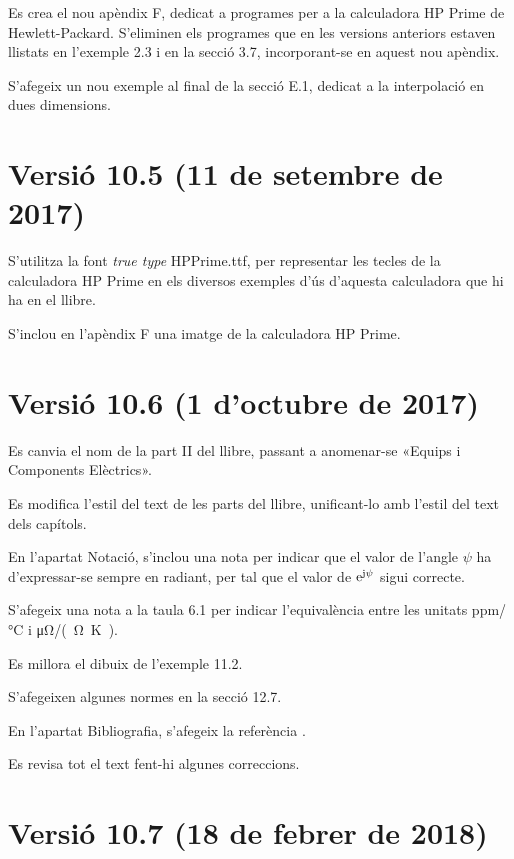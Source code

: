 Es crea el nou apèndix F, dedicat a programes per a la calculadora \textsf{HP Prime} de Hewlett-Packard. S'eliminen els programes que en les versions anteriors estaven llistats en l'exemple 2.3 i en la secció 3.7, incorporant-se en aquest nou apèndix.

S'afegeix un nou exemple al final de la secció E.1, dedicat  a la interpolació en dues dimensions.

\section*{Versió 10.5 (11 de setembre de 2017)}

S'utilitza la font \textit{true type} \textsf{HPPrime.ttf}, per representar les tecles de la calculadora \textsf{HP Prime} en els diversos exemples d'ús d'aquesta calculadora que hi ha en el llibre.

S'inclou en l'apèndix F una imatge de la calculadora \textsf{HP Prime}.


\section*{Versió 10.6 (1 d'octubre de 2017)}

Es canvia el nom de la part II del llibre, passant a anomenar-se «Equips i Components Elèctrics».

Es modifica l'estil del text de les parts del llibre, unificant-lo amb l'estil del text dels capítols.

En l'apartat Notació, s'inclou una nota per indicar  que el valor de l'angle $\psi$ ha d'expressar-se sempre en radiant, per tal que el valor de $\mathrm{e}^{\mathrm{j}\psi}$ sigui correcte.

S'afegeix una nota a la taula 6.1 per indicar l'equivalència entre les unitats \unit{ppm/\degreeCelsius}  i \unit{\micro\ohm/(\ohm.\kelvin)}.

Es millora el dibuix de l'exemple 11.2.

S’afegeixen algunes normes en la secció 12.7.

En l'apartat Bibliografia, s'afegeix la referència \cite{BUR}.

Es revisa tot el text fent-hi algunes correccions.


\section*{Versió 10.7 (18 de febrer de 2018)}

